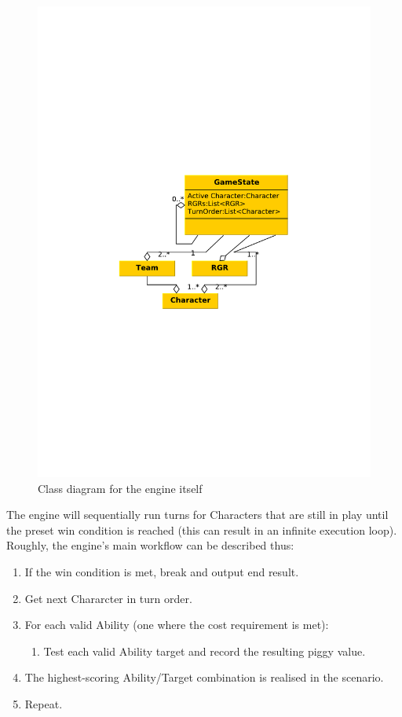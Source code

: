 \begin{figure}[!h]
\centering
\includegraphics[scale=.5, clip=true, trim=0cm 8cm 1cm 8cm]{img/engine_class_diagram}
\caption{\label{figure:design:engine:engine}Class diagram for the engine itself}
\end{figure}

The engine will sequentially run turns for Characters that are still in play until the preset win condition is reached (this can result in an infinite execution loop). Roughly, the engine's main workflow can be described thus:

\begin{enumerate}
	\item If the win condition is met, break and output end result.
	\item Get next Chararcter in turn order.
	\item For each valid Ability (one where the cost requirement is met):
	\begin{enumerate}
		\item Test each valid Ability target and record the resulting piggy value.
	\end{enumerate}
	\item The highest-scoring Ability/Target combination is realised in the scenario.
	\item Repeat.
\end{enumerate}

